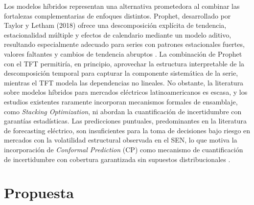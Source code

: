 Los modelos híbridos representan una alternativa prometedora al combinar las fortalezas complementarias de enfoques distintos. Prophet, desarrollado por Taylor y Letham (2018) \cite{Prophet} ofrece una descomposición explícita de tendencia, estacionalidad múltiple y efectos de calendario mediante un modelo aditivo, resultando especialmente adecuado para series con patrones estacionales fuertes, valores faltantes y cambios de tendencia abruptos \cite{Prophet}. La combinación de Prophet con el TFT permitiría, en principio, aprovechar la estructura interpretable de la descomposición temporal para capturar la componente sistemática de la serie, mientras el TFT modela las dependencias no lineales. No obstante, la literatura sobre modelos híbridos para mercados eléctricos latinoamericanos es escasa, y los estudios existentes raramente incorporan mecanismos formales de ensamblaje, como \textit{Stacking Optimization}, ni abordan la cuantificación de incertidumbre con garantías estadísticas. Las predicciones puntuales, predominantes en la literatura de forecasting eléctrico, son insuficientes para la toma de decisiones bajo riesgo en mercados con la volatilidad estructural observada en el SEN, lo que motiva la incorporación de \textit{Conformal Prediction} (CP) como mecanismo de cuantificación de incertidumbre con cobertura garantizada sin supuestos distribucionales \cite{ConformalPrediction}.

\section{Propuesta}

